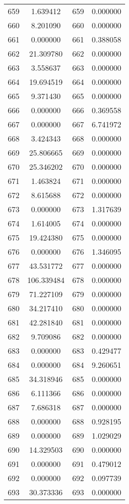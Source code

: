 \documentclass[12pt]{article}
\begin{document}
\begin{longtable}{@{}cccc@{}}
659 & 1.639412 & 659 & 0.000000 \\
660 & 8.201090 & 660 & 0.000000 \\
661 & 0.000000 & 661 & 0.388058 \\
662 & 21.309780 & 662 & 0.000000 \\
663 & 3.558637 & 663 & 0.000000 \\
664 & 19.694519 & 664 & 0.000000 \\
665 & 9.371430 & 665 & 0.000000 \\
666 & 0.000000 & 666 & 0.369558 \\
667 & 0.000000 & 667 & 6.741972 \\
668 & 3.424343 & 668 & 0.000000 \\
669 & 25.806665 & 669 & 0.000000 \\
670 & 25.346202 & 670 & 0.000000 \\
671 & 1.463824 & 671 & 0.000000 \\
672 & 8.615688 & 672 & 0.000000 \\
673 & 0.000000 & 673 & 1.317639 \\
674 & 1.614005 & 674 & 0.000000 \\
675 & 19.424380 & 675 & 0.000000 \\
676 & 0.000000 & 676 & 1.346095 \\
677 & 43.531772 & 677 & 0.000000 \\
678 & 106.339484 & 678 & 0.000000 \\
679 & 71.227109 & 679 & 0.000000 \\
680 & 34.217410 & 680 & 0.000000 \\
681 & 42.281840 & 681 & 0.000000 \\
682 & 9.709086 & 682 & 0.000000 \\
683 & 0.000000 & 683 & 0.429477 \\
684 & 0.000000 & 684 & 9.260651 \\
685 & 34.318946 & 685 & 0.000000 \\
686 & 6.111366 & 686 & 0.000000 \\
687 & 7.686318 & 687 & 0.000000 \\
688 & 0.000000 & 688 & 0.928195 \\
689 & 0.000000 & 689 & 1.029029 \\
690 & 14.329503 & 690 & 0.000000 \\
691 & 0.000000 & 691 & 0.479012 \\
692 & 0.000000 & 692 & 0.097739 \\
693 & 30.373336 & 693 & 0.000000 \\

\end{longtable}
\end{document}
